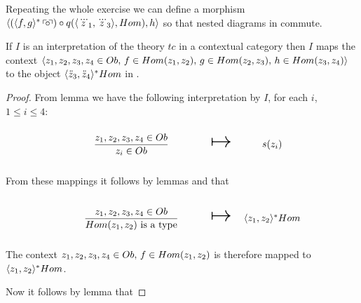 Repeating the whole exercise we can  define a morphism $\langle(\langle f,g\rangle^*\left\ulcorner\kern-2pt\circ \kern-2pt\right\urcorner) \circ q(\langle\dddot z_1,\dddot z_3\rangle,Hom),h\rangle$ so that nested diagrams in
commute.


\begin{lemma}
If $I$ is an interpretation of the theory $tc$ in a contextual category \catcw then
$I$ maps the context $\langle z_1,z_2,z_3,z_4 \in Ob,\,f \in Hom(z_1,z_2),\,g \in Hom(z_2,z_3),\,h \in Hom(z_3,z_4)\rangle$ to the object $\langle\ddot z_3,\ddot z_4\rangle^*Hom$ in \catc.
\end{lemma}
\begin{proof}
\newcommand {\forceSOURCEwidth}{\rule{5cm}{0pt}}  %
\newcommand {\forceTARGETwidth}{\rule{2.2cm}{0pt}}

From lemma  we have the following interpretation by $I$, for each $i$, $1 \leq i \leq 4$:
\begin{equation*}
\begin{array}{c c c}
\forceSOURCEwidth & & \forceTARGETwidth \\ [-0.1cm]
\gatdisplayrule{\zOOOO}{\ofT{z_i}{Ob}} & \Imapsto & s(z_i) 
\end{array}
\end{equation*}

From these mappings it follows by lemmas  and  that 

\begin{equation*}
\begin{array}{c c c}
\forceSOURCEwidth & & \forceTARGETwidth \\ [-0.1cm]
\gatdisplayrule{\zOOOO}{\isT{Hom(z_1,z_2)}} & \Imapsto & \associativitypremisepoppopmapped 
\end{array}
\end{equation*}

The context $z_1,z_2,z_3,z_4 \in Ob,\,f \in Hom(z_1,z_2)$ is therefore mapped to $\langle z_1,z_2\rangle^*Hom$.

Now it follows by lemma  that 


\end{proof}
